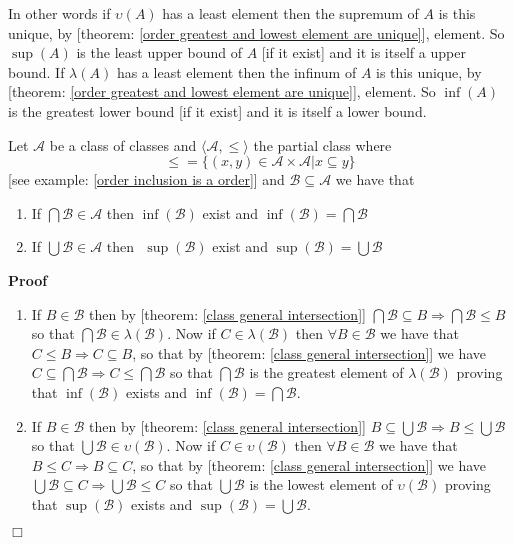 \documentclass{book}
\newenvironment{proof}{\noindent\textbf{Proof\ }}{\hspace*{\fill}$\Box$\medskip}
\begin{document}
In other words if $\upsilon (A)$ has a least element then the supremum of $A$
is this unique, by [theorem: \ref{order greatest and lowest element are
unique}], element. So $\sup (A)$ is the least upper bound of $A$ [if it exist]
and it is itself a upper bound. If $\lambda (A)$ has a least element then the
infinum of $A$ is this unique, by [theorem: \ref{order greatest and lowest
element are unique}], element. So $\inf (A)$ is the greatest lower bound [if
it exist] and it is itself a lower bound.

\begin{example}
  \label{order example inclusion order and sup, inf}Let $\mathcal{A}$ be a
  class of classes and $\langle \mathcal{A}, \leqslant \rangle$ the partial
  class where
  \[ \leqslant = \{ (x, y) \in \mathcal{A} \times \mathcal{A}|x \subseteq y \}
  \]
  [see example: \ref{order inclusion is a order}] and $\mathcal{B} \subseteq
  \mathcal{A}$ we have that
  \begin{enumerate}
    \item If $\bigcap \mathcal{B} \in \mathcal{A}$ then $\inf (\mathcal{B})$
    exist and $\inf (\mathcal{B}) = \bigcap \mathcal{B}$
    
    \item If $\bigcup \mathcal{B} \in \mathcal{A} \text{ then }$ $\sup
    (\mathcal{B})$ exist and $\sup (\mathcal{B}) = \bigcup \mathcal{B}$
  \end{enumerate}
\end{example}

\begin{proof}
  
  \begin{enumerate}
    \item If $B \in \mathcal{B}$ then by [theorem: \ref{class general
    intersection}] $\bigcap \mathcal{B} \subseteq B \Rightarrow \bigcap
    \mathcal{B} \leqslant B$ so that $\bigcap \mathcal{B} \in \lambda
    (\mathcal{B})$. Now if $C \in \lambda (\mathcal{B})$ then $\forall B \in
    \mathcal{B}$ we have that $C \leqslant B \Rightarrow C \subseteq B$, so
    that by [theorem: \ref{class general intersection}] we have $C \subseteq
    \bigcap \mathcal{B} \Rightarrow C \leqslant \bigcap \mathcal{B}$ so that
    $\bigcap \mathcal{B}$ is the greatest element of $\lambda (\mathcal{B})$
    proving that $\inf (\mathcal{B})$ exists and $\inf (\mathcal{B}) = \bigcap
    \mathcal{B}$.
    
    \item If $B \in \mathcal{B}$ then by [theorem: \ref{class general
    intersection}] $B \subseteq \bigcup \mathcal{B} \Rightarrow B \leqslant
    \bigcup \mathcal{B}$ so that $\bigcup \mathcal{B} \in \upsilon
    (\mathcal{B})$. Now if $C \in \upsilon (\mathcal{B})$ then $\forall B \in
    \mathcal{B}$ we have that $B \leqslant C \Rightarrow B \subseteq C$, so
    that by [theorem: \ref{class general intersection}] we have $\bigcup
    \mathcal{B} \subseteq C \Rightarrow \bigcup \mathcal{B} \leqslant C$ so
    that $\bigcup \mathcal{B}$ is the lowest element of $\upsilon
    (\mathcal{B})$ proving that $\sup (\mathcal{B})$ exists and $\sup
    (\mathcal{B}) = \bigcup \mathcal{B}$.
  \end{enumerate}
\end{proof}
\end{document}
